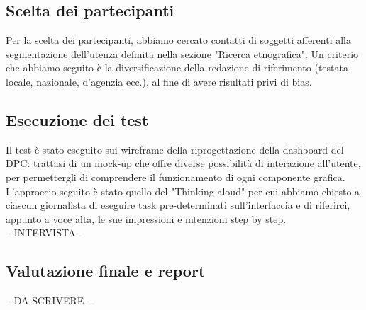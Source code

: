 \subsection{Scelta dei partecipanti}
\label{ss:scelta-partecipanti}
Per la scelta dei partecipanti, abbiamo cercato contatti di soggetti afferenti alla segmentazione dell'utenza definita nella sezione "Ricerca etnografica". Un criterio che abbiamo seguito è la diversificazione della redazione di riferimento (testata locale, nazionale, d'agenzia ecc.), al fine di avere risultati privi di bias.

\subsection{Esecuzione dei test}
\label{ss:esecuzione-test}
Il test è stato eseguito sui wireframe della riprogettazione della dashboard del DPC: trattasi di un mock-up che offre diverse possibilità di interazione all'utente, per permettergli di comprendere il funzionamento di ogni componente grafica.\\
L'approccio seguito è stato quello del "Thinking aloud" per cui abbiamo chiesto a ciascun giornalista di eseguire task pre-determinati sull'interfaccia e di riferirci, appunto a voce alta, le sue impressioni e intenzioni step by step.\\

-- INTERVISTA --

\subsection{Valutazione finale e report}
\label{ss:valutazione-finale-report}

-- DA SCRIVERE --